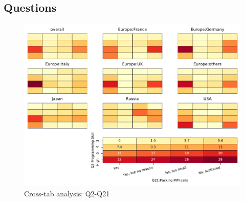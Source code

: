 
\subsection{Questions}


\begin{figure}
\begin{center}
\includegraphics[width=12cm]{../pdfs/Q2-Q21.pdf}
\caption{Cross-tab analysis: Q2-Q21}
\label{fig:Q2-Q21}
\end{center}
\end{figure}
